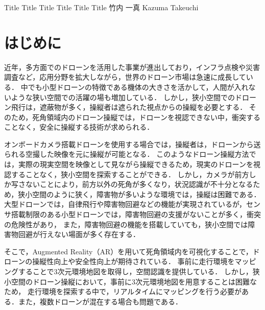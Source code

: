 \documentclass[a4paper,10pt,twocolumn,uplatex]{jsarticle}
\date{11}
\begin{document}
{Title Title Title Title Title Title}
{竹内 一真}
{Kazuma Takeuchi}


\section{はじめに}
近年，多方面でのドローンを活用した事業が進出しており，インフラ点検や災害調査など，応用分野を拡大しながら，世界のドローン市場は急速に成長している\cite{Nonami}．
中でも小型ドローンの特徴である機体の大きさを活かして，人間が入れないような狭い空間での活躍の場も増加している．
しかし，狭小空間でのドローン飛行は，遮蔽物が多く，操縦者は遮られた視点からの操縦を必要とする．
そのため，死角領域内のドローン操縦では，ドローンを視認できない中，衝突することなく，安全に操縦する技術が求められる．
\par
オンボードカメラ搭載ドローンを使用する場合では，操縦者は，ドローンから送られる空撮した映像を元に操縦が可能となる．
このようなドローン操縦方法では，実際の現実空間を映像として見ながら操縦できるため，現実のドローンを視認することなく，狭小空間を探索することができる．
しかし，カメラが前方しか写さないことにより，前方以外の死角が多くなり，状況認識が不十分となるため\cite{Green}，狭小空間のように狭く，障害物が多いような環境では，操縦は困難である．
大型ドローンでは，自律飛行や障害物回避などの機能が実現されているが，センサ搭載制限のある小型ドローンでは，障害物回避の支援がないことが多く，衝突の危険性があり，
また，障害物回避の機能を搭載していても，狭小空間では障害物回避が行えない場面が多く存在する\cite{syohou}．
\par
そこで，Augmented Reality（AR）を用いて死角領域内を可視化することで，ドローンの操縦性向上や安全性向上が期待されている．
事前に走行環境をマッピングすることで3次元環境地図を取得し，空間認識を提供している．
しかし，狭小空間のドローン操縦において，事前に3次元環境地図を用意することは困難なため，
走行環境を探索する中で，リアルタイムにマッピングを行う必要がある．また，複数ドローンが混在する場合も問題である．
\end{document}
